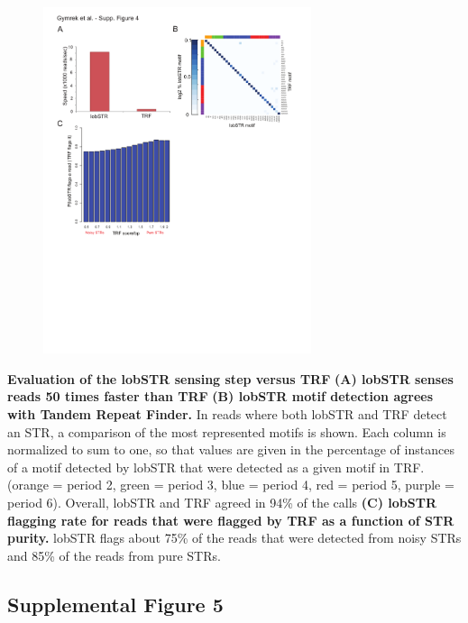{\begin{figure}[h!]
\centering
\label{fig:lobsup4}
\includegraphics[width=0.7\textwidth]{Figures/Chapter2/SuppFig4.pdf}
\end{figure}
\textbf{Evaluation of the lobSTR sensing step versus TRF} \textbf{(A) lobSTR senses reads 50 times faster than TRF} \textbf{(B) lobSTR motif detection agrees with Tandem Repeat Finder.} In reads where both lobSTR and TRF detect an STR, a comparison of the most represented motifs is shown. Each column is normalized to sum to one, so that values are given in the percentage of instances of a motif detected by lobSTR that were detected as a given motif in TRF. (orange = period 2, green = period 3, blue = period 4, red = period 5, purple = period 6). Overall, lobSTR and TRF agreed in 94\% of the calls \textbf{(C) lobSTR flagging rate for reads that were flagged by TRF as a function of STR purity.} lobSTR flags about 75\% of the reads that were detected from noisy STRs and 85\% of the reads from pure STRs. 

\pagebreak
\subsection{Supplemental Figure 5}

}
